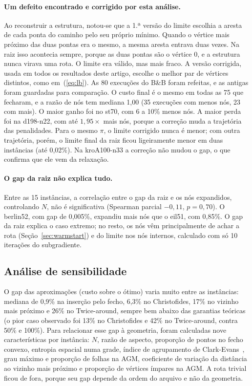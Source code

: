\paragraph{Um defeito encontrado e corrigido por esta análise.} Ao reconstruir a
estrutura, notou-se que a 1.ª versão do limite escolhia a aresta de cada ponta do caminho
pelo seu próprio mínimo. Quando o vértice mais próximo das duas pontas era o mesmo, a
mesma aresta entrava duas vezes. Na raiz isso acontecia sempre, porque as duas pontas são
o vértice 0, e a estrutura nunca virava uma rota. O limite era válido, mas mais fraco. A
versão corrigida, usada em todos os resultados deste artigo, escolhe o melhor par de
vértices distintos, como em~(\ref{eq:lb}). As 80 execuções do B\&B foram refeitas, e as
antigas foram guardadas para comparação. O custo final é o mesmo em todas as 75 que
fecharam, e a razão de nós tem mediana 1,00 (35 execuções com menos nós, 23 com mais). O
maior ganho foi no st70, com 6 a 10\% menos nós. A maior perda foi na d198-n22, com até
$1{,}95\times$ mais nós, porque a correção muda a trajetória das penalidades. Para o
mesmo $\pi$, o limite corrigido nunca é menor; com outra trajetória, porém, o limite final
da raiz ficou ligeiramente menor em duas instâncias (até 0,02\%). Na kroA100-n33 a
correção não mudou o gap, o que confirma que ele vem da relaxação.

\paragraph{O gap da raiz não explica tudo.} Entre as 15 instâncias, a correlação entre o
gap da raiz e os nós expandidos, controlando $N$, não é significativa (Spearman parcial
$-0{,}11$, $p = 0{,}70$). O berlin52, com gap de 0,005\%, expandiu mais nós que o eil51,
com 0,85\%. O gap da raiz explica o caso extremo; no resto, os nós vêm principalmente de achar
a rota (Seção~\ref{sec:warmstart}) e do limite nos nós internos, calculado com só 10
iterações do subgradiente.

\subsection{Análise de sensibilidade}\label{sec:sensitivity}

O gap das aproximações (custo sobre o ótimo) varia muito entre as instâncias: mediana de
0,9\% na inserção pelo fecho, 6,3\% no Christofides, 17\% no vizinho mais próximo e 26\% no
Twice-around, sempre bem abaixo das garantias teóricas (o pior caso observado foi 13\% no
Christofides e 42\% no Twice-around, contra 50\% e 100\%). Para relacionar esse gap à
geometria, foram calculadas nove características por instância: $N$, razão de aspecto,
proporção de pontos no fecho convexo, entropia espacial numa grade, índice de agrupamento
de Clark-Evans~\cite{clark1954}, grau máximo e proporção de folhas na AGM, coeficiente de
variação da distância ao vizinho mais próximo e proporção de vértices ímpares na AGM. A
rota trivial ficou de fora, porque seu gap depende da ordem do arquivo e não da geometria.

